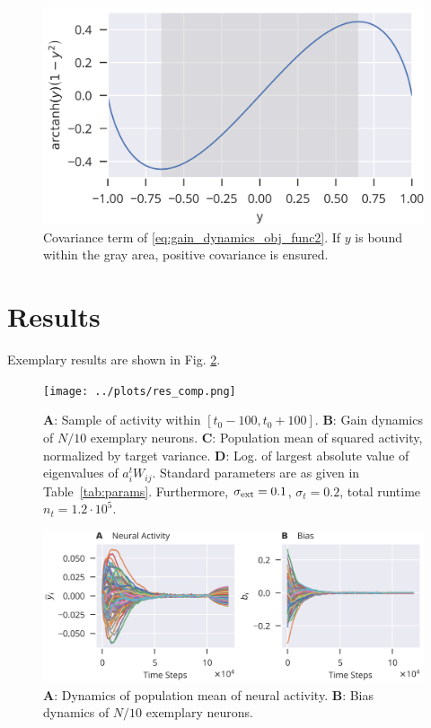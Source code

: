 \documentclass[10pt,a4paper]{article}
\begin{document}
\begin{figure}
	\centering
	\includegraphics{../plots/gain_grad_descent.png}
	\caption{Covariance term of \eqref{eq:gain_dynamics_obj_func2}. If $y$ is bound within the gray area, positive covariance is ensured.}
	\label{fig:gain_cov}
\end{figure}

\section{Results}
Exemplary results are shown in Fig. \ref{fig:ex_results}.

\begin{figure}[h]
\texttt{[image: ../plots/res\_comp.png]}
\caption{{\bf A}: Sample of activity within $\left[ t_0 - 100, t_0 + 100 \right]$. {\bf B}: Gain dynamics of $N/10$ exemplary neurons. {\bf C}: Population mean of squared activity, normalized by target variance. {\bf D}: Log. of largest absolute value of eigenvalues of $a_i^t W_{ij} $. Standard parameters are as given in Table~\ref{tab:params}. Furthermore, $\sigma_{\rm ext} = 0.1$, $\sigma_{t} = 0.2$, total runtime $n_t = 1.2\cdot10^5$. }
\label{fig:ex_results}
\end{figure}

\begin{figure}[h]
	\centering
	\includegraphics[width=\textwidth]{../plots/res_comp_act_bias.png}
	\caption{{\bf A}: Dynamics of population mean of neural activity. {\bf B}: Bias dynamics of $N/10$ exemplary neurons. }
\end{figure}
\end{document}
